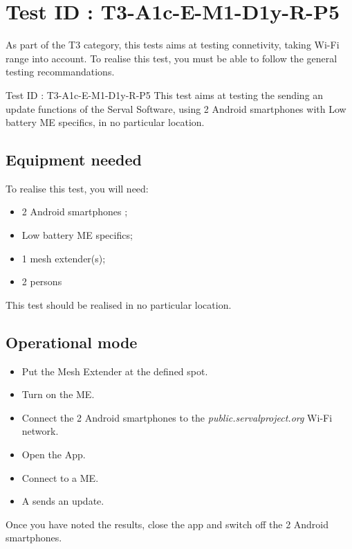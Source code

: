 \documentclass[oneside]{book}
\begin{document}
\section{Test ID : T3-A1c-E-M1-D1y-R-P5}
\begin{itshape}
As part of the T3 category, this tests aims at testing connetivity, taking Wi-Fi range into account.
To realise this test, you must be able to follow the general testing recommandations.
\end{itshape}
\newline
Test ID : T3-A1c-E-M1-D1y-R-P5
 This test aims at testing the sending an update functions of the Serval Software, using 2 Android smartphones with Low battery ME specifics, in no particular location.
\subsection{Equipment needed} To realise this test, you will need:
\begin{itemize}
\item 2 Android smartphones ;
\item Low battery ME specifics;
\item 1 mesh extender(s);
\item 2 persons
\end{itemize}
This test should be realised in no particular location.
\subsection{Operational mode} \begin{itemize}
\item Put the Mesh Extender at the defined spot.
\item Turn on the ME.
\item Connect the 2 Android smartphones to the \emph{public.servalproject.org} Wi-Fi network.
\item Open the App.
\item Connect to a ME.
\item A sends an update.
\end{itemize}
Once you have noted the results, close the app and switch off the 2 Android smartphones.
\end{document}
